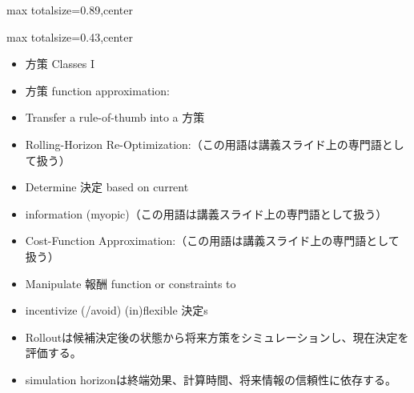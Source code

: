 \begin{minipage}[t]{0.58\textwidth}
\begin{adjustbox}{max totalsize={\textwidth}{0.89\textheight},center}
\begin{minipage}{\textwidth}
\end{minipage}
\end{adjustbox}
\end{minipage}


\clearpage
{}
\begin{minipage}[t]{0.405\textwidth}
\begin{adjustbox}{max totalsize={\textwidth}{0.43\textheight},center}
\begin{minipage}{\textwidth}\scriptsize
{}\begin{itemize}
\item 方策 Classes I
\item 方策 function approximation:
\item Transfer a rule-of-thumb into a 方策
\item Rolling-Horizon Re-Optimization:（この用語は講義スライド上の専門語として扱う）
\item Determine 決定 based on current
\item information (myopic)（この用語は講義スライド上の専門語として扱う）
\item Cost-Function Approximation:（この用語は講義スライド上の専門語として扱う）
\item Manipulate 報酬 function or constraints to
\item incentivize (/avoid) (in)flexible 決定s
\end{itemize}\begin{itemize}
\item Rolloutは候補決定後の状態から将来方策をシミュレーションし、現在決定を評価する。
\item simulation horizonは終端効果、計算時間、将来情報の信頼性に依存する。
\end{itemize}
\end{minipage}
\end{adjustbox}
\end{minipage}\hfill
